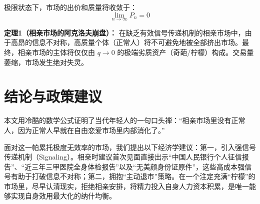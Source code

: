 \documentclass[11pt, a4paper, UTF8]{chinese-erj}
\begin{document}
极限状态下，市场的出价和质量将收敛于：
\begin{equation}
    \lim_{n \to \infty} P_n = 0
\end{equation}

\textbf{定理1（相亲市场的阿克洛夫崩盘）：} 在缺乏有效信号传递机制的相亲市场中，由于高昂的信息不对称，高质量个体（正常人）将不可避免地被全部挤出市场。最终，相亲市场的主体将仅仅由 $q \to 0$ 的极端劣质资产（奇葩/柠檬）构成。交易量萎缩，市场发生绝对失灵。

\section{结论与政策建议}

本文用冷酷的数学公式证明了当代年轻人的一句口头禅：“相亲市场里没有正常人，因为正常人早就在自由恋爱市场里内部消化了。”

面对这一帕累托极度无效率的市场，我们提出以下经济学建议：第一，引入强信号传递机制（Signaling）\parencite{spence1973}。相亲时建议首次见面直接出示“中国人民银行个人征信报告”、“近三年三甲医院全身体检报告”以及“无美颜身份证原件”，这些高成本强信号有助于打破信息不对称；第二，拥抱“主动退市”策略。在一个注定充满“柠檬”的市场里，尽早认清现实，拒绝相亲安排，将精力投入自身人力资本积累，是唯一能够实现自身效用最大化的纳什均衡。

\erjref
\printbibliography[heading=none]
\end{document}
